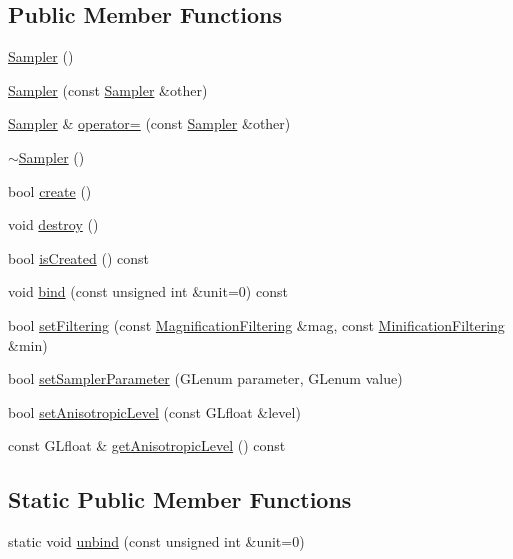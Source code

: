 \subsection*{Public Member Functions}
\begin{DoxyCompactItemize}
\item 
\hyperlink{classburn_1_1_sampler_a480b4acfd17dd57a0c121bb5ebe3d656}{Sampler} ()
\item 
\hyperlink{classburn_1_1_sampler_a738307fd709142b1a44e0c6a035ddafa}{Sampler} (const \hyperlink{classburn_1_1_sampler}{Sampler} \&other)
\item 
\hyperlink{classburn_1_1_sampler}{Sampler} \& \hyperlink{classburn_1_1_sampler_a701aaca7ccac75a4dba5b495c9ed8858}{operator=} (const \hyperlink{classburn_1_1_sampler}{Sampler} \&other)
\item 
\hyperlink{classburn_1_1_sampler_ab5f62848d71b5b270430d746c7d8331c}{$\sim$\-Sampler} ()
\item 
bool \hyperlink{classburn_1_1_sampler_ac71624331b97e00c64a0ef51dd16e06f}{create} ()
\item 
void \hyperlink{classburn_1_1_sampler_adad5b4e01539c026b9dca3cb69b5d85e}{destroy} ()
\item 
bool \hyperlink{classburn_1_1_sampler_a74e374b64020a7d2f682b2a7c5e6c698}{is\-Created} () const 
\item 
void \hyperlink{classburn_1_1_sampler_a0afeda41b62a6cb24194036f6476682f}{bind} (const unsigned int \&unit=0) const 
\item 
bool \hyperlink{classburn_1_1_sampler_a514d577016bec1680d0bbfb4cb60c89e}{set\-Filtering} (const \hyperlink{classburn_1_1_sampler_a09433eae16f8623591d415a3f8c6afec}{Magnification\-Filtering} \&mag, const \hyperlink{classburn_1_1_sampler_a09d6e36f45577a56ce230549aeaaab10}{Minification\-Filtering} \&min)
\item 
bool \hyperlink{classburn_1_1_sampler_a6b4d9dc71c000456eb17409338248fed}{set\-Sampler\-Parameter} (G\-Lenum parameter, G\-Lenum value)
\item 
bool \hyperlink{classburn_1_1_sampler_ae78e2a3cdad25f52ce5683659b7215b1}{set\-Anisotropic\-Level} (const G\-Lfloat \&level)
\item 
const G\-Lfloat \& \hyperlink{classburn_1_1_sampler_ac89ac6da7f36d70d2adeb055a995e51b}{get\-Anisotropic\-Level} () const 
\end{DoxyCompactItemize}
\subsection*{Static Public Member Functions}
\begin{DoxyCompactItemize}
\item 
static void \hyperlink{classburn_1_1_sampler_a4f188f32a1a99deb15784b76a5e90121}{unbind} (const unsigned int \&unit=0)
\end{DoxyCompactItemize}


